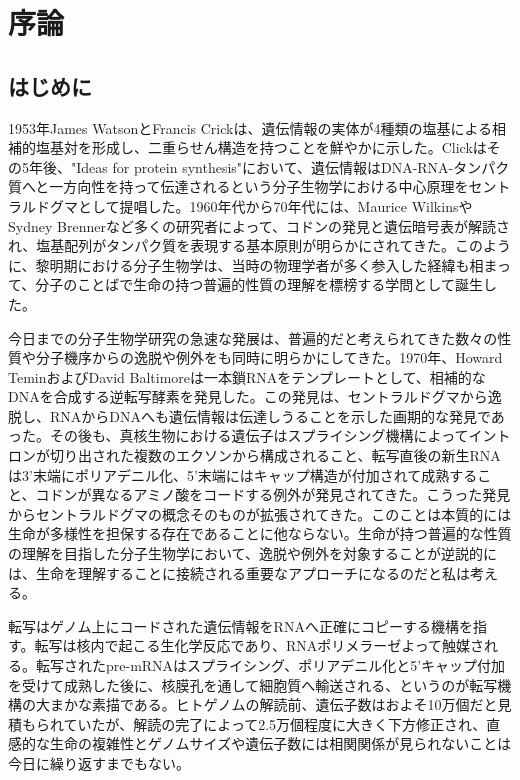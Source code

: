 \chapter{序論}

\section{はじめに}
1953年James WatsonとFrancis Crickは、遺伝情報の実体が4種類の塩基による相補的塩基対を形成し、二重らせん構造を持つことを鮮やかに示した。Clickはその5年後、"Ideas for protein synthesis"において、遺伝情報はDNA-RNA-タンパク質へと一方向性を持って伝達されるという分子生物学における中心原理をセントラルドグマとして提唱した。1960年代から70年代には、Maurice WilkinsやSydney Brennerなど多くの研究者によって、コドンの発見と遺伝暗号表が解読され、塩基配列がタンパク質を表現する基本原則が明らかにされてきた。このように、黎明期における分子生物学は、当時の物理学者が多く参入した経緯も相まって、分子のことばで生命の持つ普遍的性質の理解を標榜する学問として誕生した。
\par
今日までの分子生物学研究の急速な発展は、普遍的だと考えられてきた数々の性質や分子機序からの逸脱や例外をも同時に明らかにしてきた。1970年、Howard TeminおよびDavid Baltimoreは一本鎖RNAをテンプレートとして、相補的なDNAを合成する逆転写酵素を発見した。この発見は、セントラルドグマから逸脱し、RNAからDNAへも遺伝情報は伝達しうることを示した画期的な発見であった。その後も、真核生物における遺伝子はスプライシング機構によってイントロンが切り出された複数のエクソンから構成されること、転写直後の新生RNAは3'末端にポリアデニル化、5'末端にはキャップ構造が付加されて成熟すること、コドンが異なるアミノ酸をコードする例外が発見されてきた。こうった発見からセントラルドグマの概念そのものが拡張されてきた。このことは本質的には生命が多様性を担保する存在であることに他ならない。生命が持つ普遍的な性質の理解を目指した分子生物学において、逸脱や例外を対象することが逆説的には、生命を理解することに接続される重要なアプローチになるのだと私は考える。
\par
転写はゲノム上にコードされた遺伝情報をRNAへ正確にコピーする機構を指す。転写は核内で起こる生化学反応であり、RNAポリメラーゼよって触媒される。転写されたpre-mRNAはスプライシング、ポリアデニル化と5'キャップ付加を受けて成熟した後に、核膜孔を通して細胞質へ輸送される、というのが転写機構の大まかな素描である。ヒトゲノムの解読前、遺伝子数はおよそ10万個だと見積もられていたが、解読の完了によって2.5万個程度に大きく下方修正され、直感的な生命の複雑性とゲノムサイズや遺伝子数には相関関係が見られないことは今日に繰り返すまでもない。
\par
